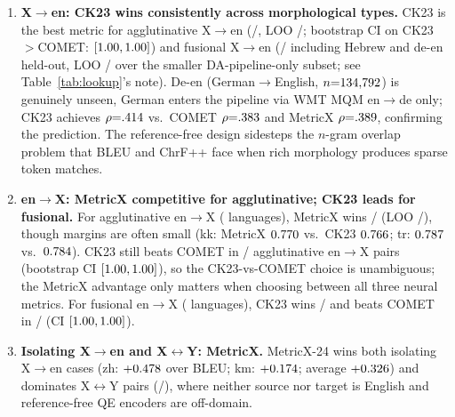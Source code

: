 \documentclass[11pt]{article}
\begin{document}
\begin{enumerate}[leftmargin=*,itemsep=4pt,topsep=4pt]
  \item \textbf{X$\to$en: CK23 wins consistently across morphological types.} CK23 is the best metric for agglutinative X$\to$en (\WinXtoEnAgglutin/\WinTotalXtoEnAgglutin, LOO \LOOXtoEnAgglutin/\LOOTotalXtoEnAgglutin; bootstrap CI on CK23$>$COMET: $[1.00, 1.00]$) and fusional X$\to$en (\WinXtoEnFusional/\WinTotalXtoEnFusional{} including Hebrew and de-en held-out, LOO \LOOXtoEnFusional/\LOOTotalXtoEnFusional{} over the smaller DA-pipeline-only subset; see Table~\ref{tab:lookup}'s note). De-en (German$\to$English, $n{=}134{,}792$) is genuinely unseen, German enters the pipeline via WMT MQM en$\to$de only; CK23 achieves $\rho{=}.414$ vs.\ COMET $\rho{=}.383$ and MetricX $\rho{=}.389$, confirming the prediction. The reference-free design sidesteps the $n$-gram overlap problem that BLEU and ChrF++ face when rich morphology produces sparse token matches.

  \item \textbf{en$\to$X: MetricX competitive for agglutinative; CK23 leads for fusional.} For agglutinative en$\to$X (\WinTotalEntoXAgglutin{} languages), MetricX wins \WinEntoXAgglutin/\WinTotalEntoXAgglutin{} (LOO \LOOEntoXAgglutin/\LOOTotalEntoXAgglutin), though margins are often small (kk: MetricX $0.770$ vs.\ CK23 $0.766$; tr: $0.787$ vs.\ $0.784$). CK23 still beats COMET in \BeatsCometEntoXAgglutin/\WinTotalEntoXAgglutin{} agglutinative en$\to$X pairs (bootstrap CI $[1.00, 1.00]$), so the CK23-vs-COMET choice is unambiguous; the MetricX advantage only matters when choosing between all three neural metrics. For fusional en$\to$X (\WinTotalEntoXFusional{} languages), CK23 wins \WinEntoXFusional/\WinTotalEntoXFusional{} and beats COMET in \BeatsCometEntoXFusional/\WinTotalEntoXFusional{} (CI $[1.00, 1.00]$).

  \item \textbf{Isolating X$\to$en and X$\leftrightarrow$Y: MetricX.} MetricX-24 wins both isolating X$\to$en cases (zh: $+0.478$ over BLEU; km: $+0.174$; average $+0.326$) and dominates X$\leftrightarrow$Y pairs (\PivotMetricXWins/\PivotN), where neither source nor target is English and reference-free QE encoders are off-domain.
\end{enumerate}
\end{document}
